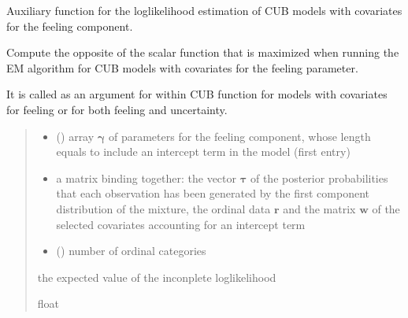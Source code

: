 \documentclass[letterpaper,10pt,english]{sphinxmanual}
\begin{document}
\begin{fulllineitems}
\label{\detokenize{cubmods:cubmods.cub_0w.effe01}}
\pysigstartsignatures
{}
\pysigstopsignatures
\sphinxAtStartPar
Auxiliary function for the log\sphinxhyphen{}likelihood estimation of CUB models
with covariates for the feeling component.

\sphinxAtStartPar
Compute the opposite of the scalar function that is maximized when running 
the E\sphinxhyphen{}M algorithm for CUB models with covariates for the feeling parameter.

\sphinxAtStartPar
It is called as an argument for  within CUB function for models with covariates for
feeling or for both feeling and uncertainty.
\begin{quote}\begin{description}
\begin{itemize}
\item {} 
\sphinxAtStartPar
{} () \textendash{} array \(\pmb \gamma\) of parameters for the feeling component, whose length equals 
 to include an intercept term in the model (first entry)

\item {} 
\sphinxAtStartPar
{} \textendash{} a matrix binding together: the vector \(\pmb\tau\) of the posterior probabilities
that each observation has been generated by the first component distribution of the mixture, 
the ordinal data \(\pmb r\) and the matrix \(\pmb w\) of the selected covariates 
accounting for an intercept term

\item {} 
\sphinxAtStartPar
{} () \textendash{} number of ordinal categories

\end{itemize}

\sphinxAtStartPar
the expected value of the inconplete log\sphinxhyphen{}likelihood

\sphinxAtStartPar
float

\end{description}\end{quote}

\end{fulllineitems}
\end{document}
